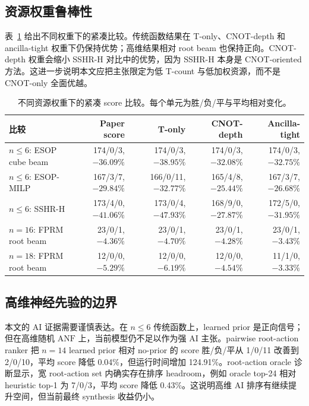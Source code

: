\documentclass[UTF8,fontset=macnew,11pt]{ctexart}
\newcommand{\anf}{\ensuremath{\mathrm{ANF}}}
\begin{document}
\subsection{资源权重鲁棒性}

表~\ref{tab:weight} 给出不同权重下的紧凑比较。传统函数结果在 T-only、CNOT-depth 和 ancilla-tight 权重下仍保持优势；高维结果相对 root beam 也保持正向。CNOT-depth 权重会缩小 SSHR-H 对比中的优势，因为 SSHR-H 本身是 CNOT-oriented 方法。这进一步说明本文应把主张限定为低 T-count 与低加权资源，而不是 CNOT-only 全面优越。

\begin{table}[t]
\centering
\small
\caption{不同资源权重下的紧凑 score 比较。每个单元为胜/负/平与平均相对变化。}
\label{tab:weight}
\begin{tabularx}{\linewidth}{>{\raggedright\arraybackslash}Xrrrr}
\toprule
比较 & Paper score & T-only & CNOT-depth & Ancilla-tight \\
\midrule
$n\leq6$: ESOP cube beam & 174/0/3, $-36.09\%$ & 174/0/3, $-38.95\%$ & 174/0/3, $-32.08\%$ & 174/0/3, $-32.75\%$ \\
$n\leq6$: ESOP-MILP & 167/3/7, $-29.84\%$ & 166/0/11, $-32.77\%$ & 165/4/8, $-25.44\%$ & 167/3/7, $-26.68\%$ \\
$n\leq6$: SSHR-H & 173/4/0, $-41.06\%$ & 173/0/4, $-47.93\%$ & 168/9/0, $-27.87\%$ & 172/5/0, $-31.95\%$ \\
$n=16$: FPRM root beam & 23/0/1, $-4.36\%$ & 23/0/1, $-4.70\%$ & 23/0/1, $-4.28\%$ & 23/0/1, $-3.43\%$ \\
$n=18$: FPRM root beam & 12/0/0, $-5.29\%$ & 12/0/0, $-6.19\%$ & 12/0/0, $-4.54\%$ & 11/1/0, $-3.33\%$ \\
\bottomrule
\end{tabularx}
\end{table}

\subsection{高维神经先验的边界}

本文的 AI 证据需要谨慎表达。在 $n\leq6$ 传统函数上，learned prior 是正向信号；但在高维随机 \anf{} 上，当前模型仍不足以作为强 AI 主张。pairwise root-action ranker 把 $n=14$ learned prior 相对 no-prior 的 score 胜/负/平从 1/0/11 改善到 2/0/10，平均 score 降低 0.04\%，但运行时间增加 124.91\%。root-action oracle 诊断显示，宽 root-action set 内确实存在排序 headroom，例如 oracle top-24 相对 heuristic top-1 为 7/0/3，平均 score 降低 0.43\%。这说明高维 AI 排序有继续提升空间，但当前最终 synthesis 收益仍小。
\end{document}
